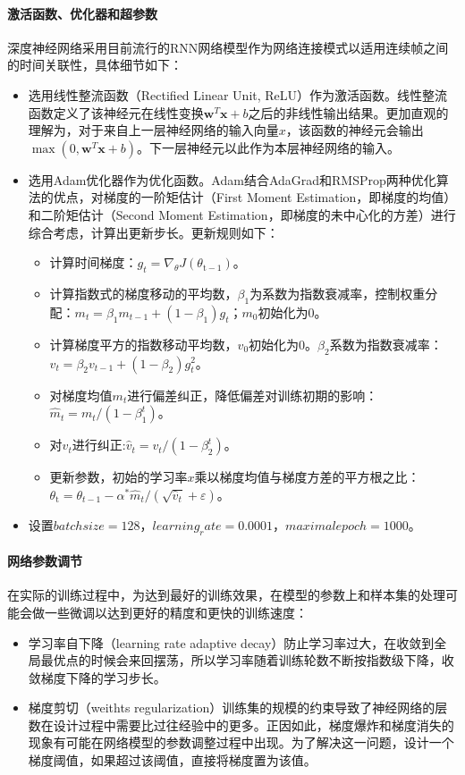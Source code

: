 \paragraph{激活函数、优化器和超参数}深度神经网络采用目前流行的RNN网络模型作为网络连接模式以适用连续帧之间的时间关联性，具体细节如下：
\begin{itemize}
	\item 选用线性整流函数（Rectified Linear Unit, ReLU）作为激活函数。线性整流函数定义了该神经元在线性变换$\mathbf{w}^{T} \mathbf{x}+b$之后的非线性输出结果。更加直观的理解为，对于来自上一层神经网络的输入向量$x$，该函数的神经元会输出$\max \left(0, \mathbf{w}^{T} \mathbf{x}+b\right)$。下一层神经元以此作为本层神经网络的输入。
	\item 选用Adam优化器作为优化函数。Adam结合AdaGrad和RMSProp两种优化算法的优点，对梯度的一阶矩估计（First Moment Estimation，即梯度的均值）和二阶矩估计（Second Moment Estimation，即梯度的未中心化的方差）进行综合考虑，计算出更新步长。更新规则如下：
	\begin{itemize}
		\item 计算时间梯度：$g_{t}=\nabla_{\theta} J\left(\theta_{\mathrm{t}-1}\right)$。
		\item 计算指数式的梯度移动的平均数，$\beta_1$为系数为指数衰减率，控制权重分配：$m_{t}=\beta_{1} m_{t-1}+\left(1-\beta_{1}\right) g_{t}$；$m_0$初始化为0。
		\item 计算梯度平方的指数移动平均数，$v_0$初始化为$0$。$\beta_2$系数为指数衰减率：$v_{t}=\beta_{2} v_{t-1}+\left(1-\beta_{2}\right) g_{t}^{2}$。
		\item 对梯度均值$m_t$进行偏差纠正，降低偏差对训练初期的影响：$\hat{m}_{t}=m_{t} /\left(1-\beta_{1}^{t}\right)$。
		\item 对$v_t$进行纠正:$\hat{v}_{t}=v_{t} /\left(1-\beta_{2}^{t}\right)$。
		\item 更新参数，初始的学习率$x$乘以梯度均值与梯度方差的平方根之比：$\theta_{\mathrm{t}}=\theta_{t-1}-\alpha^{*} \hat{m}_{t} /\left(\sqrt{\hat{v}_{t}}+\varepsilon\right)$。
	\end{itemize}
	\item 设置$batch size=128$，$learning_rate=0.0001$，$maximal epoch = 1000$。
\end{itemize}

\paragraph{网络参数调节}
在实际的训练过程中，为达到最好的训练效果，在模型的参数上和样本集的处理可能会做一些微调以达到更好的精度和更快的训练速度：
\begin{itemize}
\item{学习率自下降（learning rate adaptive decay）}防止学习率过大，在收敛到全局最优点的时候会来回摆荡，所以学习率随着训练轮数不断按指数级下降，收敛梯度下降的学习步长。

\item{梯度剪切（weithts regularization）}训练集的规模的约束导致了神经网络的层数在设计过程中需要比过往经验中的更多。正因如此，梯度爆炸和梯度消失的现象有可能在网络模型的参数调整过程中出现。为了解决这一问题，设计一个梯度阈值，如果超过该阈值，直接将梯度置为该值。
\end{itemize}

